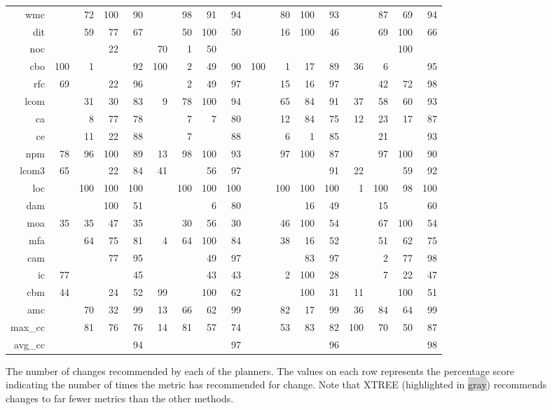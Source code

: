 \begin{figure*}[t!]
\begin{center}
\begin{tabular}{r|rrrr|rrrr|rrrr|rrrr}
wmc && 72 & 100 & 90 && 98 & 91 & 94 && 80 & 100 & 93 && 87 & 69 & 94    \bigstrut[t]\\
dit && 59 & 77 & 67 && 50 & 100 & 50 && 16 & 100 & 46 && 69 & 100 & 66    \\
noc &&& 22 && \cellcolor{lightgray}70 & 1 & 50 &&&&&&&& 100 &    \\
cbo & \cellcolor{lightgray}100 & 1 && 92 & \cellcolor{lightgray}100 & 2 & 49 & 90 & \cellcolor{lightgray}100 & 1 & 17 & 89 & \cellcolor{lightgray}36 & 6 && 95    \\
rfc & \cellcolor{lightgray}69 && 22 & 96 && 2 & 49 & 97 && 15 & 16 & 97 && 42 & 72 & 98    \\
lcom && 31 & 30 & 83 & 9 & 78 & 100 & 94 && 65 & 84 & 91 & \cellcolor{lightgray}37 & 58 & 60 & 93    \\
ca && 8 & 77 & 78 && 7 & 7 & 80 && 12 & 84 & 75 & \cellcolor{lightgray}12 & 23 & 17 & 87    \\
ce && 11 & 22 & 88 && 7 && 88 && 6 & 1 & 85 && 21 && 93    \\
npm & \cellcolor{lightgray}78 & 96 & 100 & 89 & \cellcolor{lightgray}13 & 98 & 100 & 93 && 97 & 100 & 87 && 97 & 100 & 90    \\
lcom3 & \cellcolor{lightgray}65 && 22 & 84 & \cellcolor{lightgray}41 && 56 & 97 &&&& 91 & \cellcolor{lightgray}22 && 59 & 92    \\
loc && 100 & 100 & 100 && 100 & 100 & 100 && 100 & 100 & 100 & \cellcolor{lightgray}1 & 100 & 98 & 100   \\
dam &&& 100 & 51 &&& 6 & 80 &&& 16 & 49 && 15 && 60    \\
moa & \cellcolor{lightgray}35 & 35 & 47 & 35 && 30 & 56 & 30 && 46 & 100 & 54 && 67 & 100 & 54    \\
mfa && 64 & 75 & 81 & 4 & 64 & 100 & 84 && 38 & 16 & 52 && 51 & 62 & 75    \\
cam &&& 77 & 95 &&& 49 & 97 &&& 83 & 97 && 2 & 77 & 98    \\
ic & \cellcolor{lightgray}77 &&& 45 &&& 43 & 43 && 2 & 100 & 28 && 7 & 22 & 47    \\
cbm & \cellcolor{lightgray}44 && 24 & 52 & \cellcolor{lightgray}99 && 100 & 62 &&& 100 & 31 & \cellcolor{lightgray}11 && 100 & 51    \\
amc && 70 & 32 & 99 & \cellcolor{lightgray}13 & 66 & 62 & 99 && 82 & 17 & 99 & \cellcolor{lightgray}36 & 84 & 64 & 99    \\
max\_cc && 81 & 76 & 76 & \cellcolor{lightgray}14 & 81 & 57 & 74 && 53 & 83 & 82 & \cellcolor{lightgray}100 & 70 & 50 & 87    \\
avg\_cc &&&& 94 &&&& 97 &&&& 96 &&&& 98
\end{tabular}
\end{center}
 
\caption{The number of changes recommended by each of the planners. The values on each row represents the percentage score indicating the number of times the metric has recommended for change. Note that   XTREE  (highlighted in \colorbox{lightgray}{gray}) recommends changes to far fewer metrics than the other   methods.}
\label{fig:deltas}
\end{figure*}
